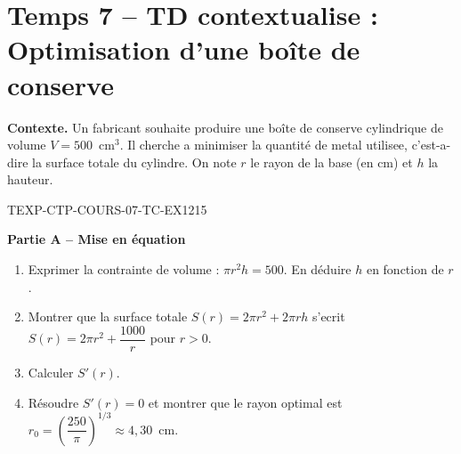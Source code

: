 

\section*{Temps 7 -- TD contextualise : Optimisation d'une boîte de conserve}

\textbf{Contexte.} Un fabricant souhaite produire une boîte de conserve cylindrique de volume $V = 500$~cm$^3$. Il cherche a minimiser la quantité de metal utilisee, c'est-a-dire la surface totale du cylindre. On note $r$ le rayon de la base (en cm) et $h$ la hauteur.

\bigskip


\begin{exercice}{TEXP-CTP-COURS-07-TC-EX1}{2}{15}

\textbf{Partie A -- Mise en équation}

\begin{enumerate}
  \item Exprimer la contrainte de volume : $\pi r^2 h = 500$. En déduire $h$ en fonction de $r$.
  \item Montrer que la surface totale $S(r) = 2\pi r^2 + 2\pi r h$ s'ecrit $S(r) = 2\pi r^2 + \dfrac{1000}{r}$ pour $r > 0$.
  \item Calculer $S'(r)$.
  \item Résoudre $S'(r) = 0$ et montrer que le rayon optimal est $r_0 = \left(\dfrac{250}{\pi}\right)^{1/3} \approx 4{,}30$~cm.
\end{enumerate}

\end{exercice}


